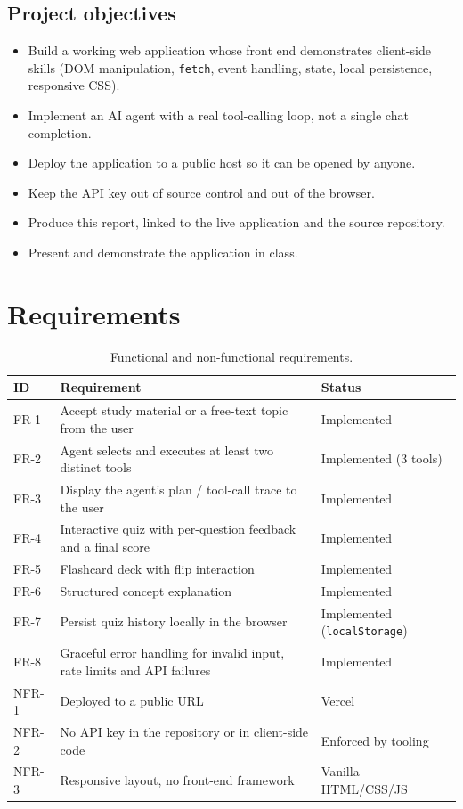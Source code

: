 \documentclass[11pt,a4paper]{article}
\begin{document}
\subsection*{Project objectives}
\begin{itemize}[leftmargin=*]
  \item Build a working web application whose front end demonstrates client-side skills
        (DOM manipulation, \texttt{fetch}, event handling, state, local persistence, responsive CSS).
  \item Implement an AI agent with a real tool-calling loop, not a single chat completion.
  \item Deploy the application to a public host so it can be opened by anyone.
  \item Keep the API key out of source control and out of the browser.
  \item Produce this report, linked to the live application and the source repository.
  \item Present and demonstrate the application in class.
\end{itemize}

\section{Requirements}

\begin{table}[h]
\centering
\caption{Functional and non-functional requirements.}
\label{tab:reqs}
\begin{tabular}{@{}p{1.2cm}p{6.6cm}p{4.4cm}@{}}
\toprule
\textbf{ID} & \textbf{Requirement} & \textbf{Status} \\
\midrule
FR-1 & Accept study material or a free-text topic from the user & Implemented \\
FR-2 & Agent selects and executes at least two distinct tools & Implemented (3 tools) \\
FR-3 & Display the agent's plan / tool-call trace to the user & Implemented \\
FR-4 & Interactive quiz with per-question feedback and a final score & Implemented \\
FR-5 & Flashcard deck with flip interaction & Implemented \\
FR-6 & Structured concept explanation & Implemented \\
FR-7 & Persist quiz history locally in the browser & Implemented (\texttt{localStorage}) \\
FR-8 & Graceful error handling for invalid input, rate limits and API failures & Implemented \\
NFR-1 & Deployed to a public URL & Vercel \\
NFR-2 & No API key in the repository or in client-side code & Enforced by tooling \\
NFR-3 & Responsive layout, no front-end framework & Vanilla HTML/CSS/JS \\
\bottomrule
\end{tabular}
\end{table}
\end{document}
